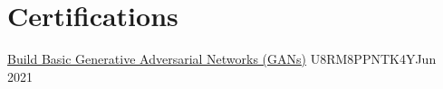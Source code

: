 \section{Certifications}
    \resumeSubHeadingListStart

    \resumePubliSubheading
    {\href{https://www.coursera.org/account/accomplishments/verify/U8RM8PPNTK4Y}{Build Basic Generative Adversarial Networks (GANs)}}
    {U8RM8PPNTK4Y}{Jun 2021}

    \resumeSubHeadingListEnd